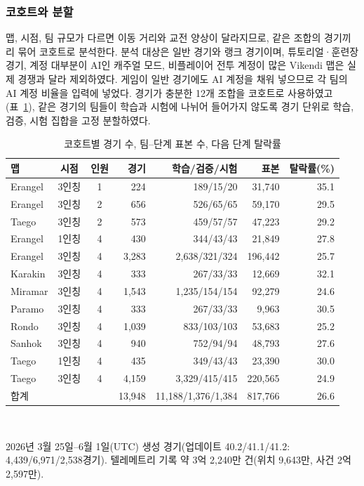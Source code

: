 \subsubsection{코호트와 분할}
\label{sec:method:cohort}
맵, 시점, 팀 규모가 다르면 이동 거리와 교전 양상이 달라지므로, 같은 조합의 경기끼리 묶어 코호트로 분석한다.
분석 대상은 일반 경기와 랭크 경기이며, 튜토리얼·훈련장 경기, 계정 대부분이 AI인 캐주얼 모드, 비플레이어 전투 계정이 많은 Vikendi 맵은 실제 경쟁과 달라 제외하였다.
게임이 일반 경기에도 AI 계정을 채워 넣으므로 각 팀의 AI 계정 비율을 입력에 넣었다.
경기가 충분한 12개 조합을 코호트로 사용하였고(표~\ref{tab:cohorts}), 같은 경기의 팀들이 학습과 시험에 나뉘어 들어가지 않도록 경기 단위로 학습, 검증, 시험 집합을  고정 분할하였다.

\begin{table}[t]
\centering
\caption{코호트별 경기 수, 팀--단계 표본 수, 다음 단계 탈락률}
\label{tab:cohorts}
\footnotesize
\setlength{\tabcolsep}{2.7pt}
\begin{tabular}{lccrrrr}
\hline
맵 & 시점 & 인원 & 경기 & 학습/검증/시험 & 표본 & 탈락률(\%) \\
\hline
Erangel & 3인칭 & 1 & 224 & 189/15/20 & 31,740 & 35.1 \\
Erangel & 3인칭 & 2 & 656 & 526/65/65 & 59,170 & 29.5 \\
Taego & 3인칭 & 2 & 573 & 459/57/57 & 47,223 & 29.2 \\
Erangel & 1인칭 & 4 & 430 & 344/43/43 & 21,849 & 27.8 \\
Erangel & 3인칭 & 4 & 3,283 & 2,638/321/324 & 196,442 & 25.7 \\
Karakin & 3인칭 & 4 & 333 & 267/33/33 & 12,669 & 32.1 \\
Miramar & 3인칭 & 4 & 1,543 & 1,235/154/154 & 92,279 & 24.6 \\
Paramo & 3인칭 & 4 & 333 & 267/33/33 & 9,963 & 30.5 \\
Rondo & 3인칭 & 4 & 1,039 & 833/103/103 & 53,683 & 25.2 \\
Sanhok & 3인칭 & 4 & 940 & 752/94/94 & 48,793 & 27.6 \\
Taego & 1인칭 & 4 & 435 & 349/43/43 & 23,390 & 30.0 \\
Taego & 3인칭 & 4 & 4,159 & 3,329/415/415 & 220,565 & 24.9 \\
\hline
합계 & & & 13,948 & 11,188/1,376/1,384 & 817,766 & 26.6 \\
\hline
\end{tabular}
\\[2pt]
\parbox{\columnwidth}{\scriptsize 2026년 3월 25일--6월 1일(UTC) 생성 경기(업데이트 40.2/41.1/41.2: 4,439/6,971/2,538경기). 텔레메트리 기록 약 3억 2,240만 건(위치 9,643만, 사건 2억 2,597만). }
\end{table}

